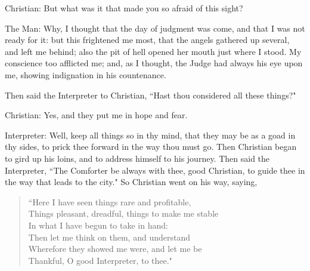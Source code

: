 Christian: But what was it that made you so afraid of this sight?

The Man: Why, I thought that the day of judgment was come, and that I was not ready for it: but this frightened me most, that the angels gathered up several, and left me behind; also the pit of hell opened her mouth just where I stood. My conscience too afflicted me; and, as I thought, the Judge had always his eye upon me, showing indignation in his countenance.

Then said the Interpreter to Christian, ``Hast thou considered all these things?"

Christian: Yes, and they put me in hope and fear.

Interpreter: Well, keep all things so in thy mind, that they may be as a goad in thy sides, to prick thee forward in the way thou must go. Then Christian began to gird up his loins, and to address himself to his journey. Then said the Interpreter, ``The Comforter be always with thee, good Christian, to guide thee in the way that leads to the city." So Christian went on his way, saying,

\begin{verse}
``Here I have seen things rare and profitable,\\
Things pleasant, dreadful, things to make me stable\\
In what I have begun to take in hand:\\
Then let me think on them, and understand\\
Wherefore they showed me were, and let me be\\
Thankful, O good Interpreter, to thee."\\
\end{verse}